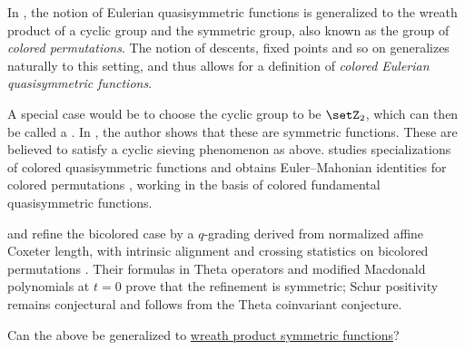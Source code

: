 In \cite{Hyatt2012}, the notion of Eulerian quasisymmetric functions is generalized to the wreath product of
a cyclic group and the symmetric group, also known as the group of \emph{colored permutations}.
The notion of descents, fixed points and so on generalizes naturally to this setting,
and thus allows for a definition of \emph{colored Eulerian quasisymmetric functions}.

A special case would be to choose the cyclic group to be $\setZ_2$, which can then be
called a .
In \cite{Lin2013}, the author shows that these are symmetric functions.
These are believed to satisfy a cyclic sieving phenomenon as above.
 studies specializations of colored
quasisymmetric functions and obtains Euler--Mahonian identities for colored
permutations \cite{Moustakas2021}, working in the basis of colored
fundamental quasisymmetric functions.

 and  refine the bicolored case by a
$q$-grading derived from normalized affine Coxeter length, with intrinsic
alignment and crossing statistics on bicolored permutations
\cite{LiaoZhu2026x}.  Their formulas in Theta operators and modified
Macdonald polynomials at $t=0$ prove that the refinement is symmetric;
Schur positivity remains conjectural and follows from the Theta coinvariant
conjecture.


\begin{question}
Can the above be generalized to \hyperref[schurWreath]{wreath product symmetric functions}?
\end{question}
